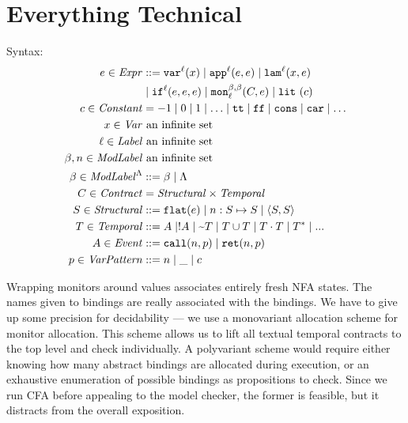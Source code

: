 \documentclass[preprint,onecolumn,9pt]{sigplanconf} %
\begin{document}
\section{Everything Technical}\label{sec:technical}
Syntax:
\begin{align*}
\mexp \in \Expr &::=
      \svar[^\mlab]{\mvar}
 \alt \sapp[^\mlab]{\mexp}{\mexp}
 \alt \slam[^\mlab]{\mvar}{\mexp} \\
&\alt \sif[^\mlab]{\mexp}{\mexp}{\mexp} 
 \alt \sMon{\mmlab}{\mmlab}{\mlab}{\mcontract, \mexp}
 \alt \slit{\mconstant} \\
\mconstant \in \Constant &= -1 \alt 0 \alt 1 \alt \ldots \alt \strue \alt \sfalse \alt \scons \alt \scar \alt \ldots \\
\mvar \in \Var &\text{ an infinite set} \\
\mlab \in \Label &\text{ an infinite set} \\
\mmlab,\mname \in \ModuleLabel &\text{ an infinite set} \\
\msmlab \in \ModuleLabel^{\toplevel} &::= \mmlab \alt \toplevel \\
\mcontract \in \Contract &= \SContract \times \TContract \\
\mscon \in \SContract &::= \sflat{\mexp} \alt \sarr{\mname}{\mscon}{\mscon} \alt \sconsc{\mscon}{\mscon} \\
\mtcon \in \TContract &::=
      \mevent
 \alt \snonevent{\mevent}
 \alt \stnot{\mtcon}
 \alt \stOr{\mtcon}{\mtcon}
 \alt \stseq{\mtcon}{\mtcon}
 \alt \stmany{\mtcon}
 \alt \sddd \\
\mevent \in \Event &::= \scallev{\mname}{\mvpat} \alt \sretev{\mname}{\mvpat} \\
\mvpat \in \VPat &::= \mname \alt \swc \alt \mconstant
\end{align*}

Wrapping monitors around values associates entirely fresh NFA states.
%
The names given to bindings are really associated with the bindings.
%
We have to give up some precision for decidability --- we use a monovariant allocation scheme for monitor allocation.
%
This scheme allows us to lift all textual temporal contracts to the top level and check individually.
%
A polyvariant scheme would require either knowing how many abstract bindings are allocated during execution, or an exhaustive enumeration of possible bindings as propositions to check.
%
Since we run CFA before appealing to the model checker, the former is feasible, but it distracts from the overall exposition.
\end{document}
